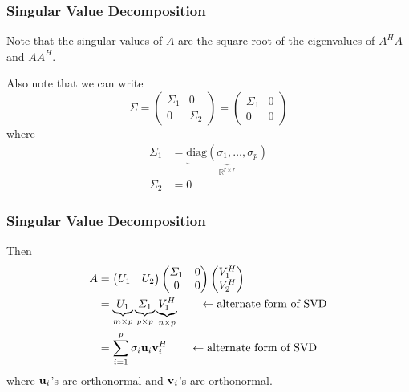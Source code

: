 \documentclass{beamer}
\begin{document}
\begin{frame}\frametitle{Singular Value Decomposition}

	Note that the singular values of $A$ are the square root of the eigenvalues of $A^HA$ and $AA^H$.
	
	\vfill
	
	Also note that we can write 
	\[
	\Sigma 
		= \begin{pmatrix}
	    	\Sigma_1 & 0 \\
	    	0 & \Sigma_2
	  	  \end{pmatrix}
	  	= \begin{pmatrix}
 			\Sigma_1 & 0 \\
 			0 & 0	
 		  \end{pmatrix}
 	\]
	where
	\begin{align*}
		\Sigma_1 &= \underbrace{
						\text{diag}(\sigma_1, \dots, \sigma_p)
					}_{\mathbb{R}^{r\times r}} \\
		\Sigma_2 &= 0
	\end{align*}
\end{frame}

\begin{frame}\frametitle{Singular Value Decomposition}
	Then 
	\begin{align*}
	 A &= \begin{pmatrix}
	    	U_1 & U_2
	  	  \end{pmatrix}
	  	  \begin{pmatrix}
	    	\Sigma_1 & 0\\
	    	0 & 0
	      \end{pmatrix}
	      \begin{pmatrix}
	    	V_1^H\\
	    	V_2^H
	  	  \end{pmatrix}  \\
	&= \underbrace{U_1}_{m\times p}
	   \underbrace{\Sigma_1}_{p\times p}
	   \underbrace{V_1^H}_{n\times p} 
	   		\qquad \leftarrow\text{alternate form of SVD}\\
	&= \sum_{i=1}^p \sigma_i\mathbf{u}_i\mathbf{v}_i^H 
			\qquad \leftarrow\text{alternate form of SVD}
	\end{align*}	
	where $\mathbf{u}_i$'s are orthonormal and $\mathbf{v}_i$'s are orthonormal.
\end{frame}
\end{document}
